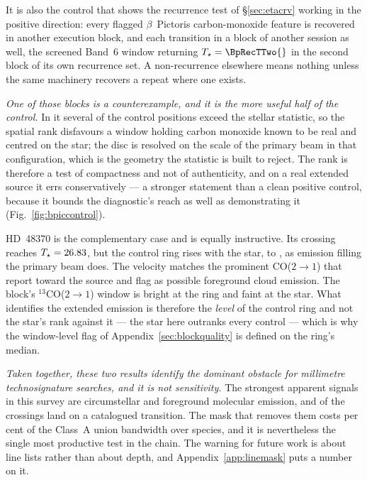 It is also the control that shows the recurrence test of
\S\ref{sec:etacrv} working in the positive direction: every flagged
$\beta$~Pictoris carbon-monoxide feature is recovered in another execution
block, and each transition in a block of another session as well, the
screened Band~6 window returning
$T_\star=\BpRecTTwo{}$ in the second block of its own recurrence set. A
non-recurrence elsewhere means nothing unless the same machinery recovers a
repeat where one exists.

\emph{One of those blocks is a counterexample, and it is the more useful half
of the control.} In it several of the \NCtrl{} control positions exceed the
stellar statistic, so the spatial rank disfavours a window holding carbon
monoxide known to be real and centred on the star; the disc is resolved on
the scale of the primary beam in that configuration, which is the geometry
the statistic is built to reject. The rank is therefore a test of
compactness and not of authenticity, and on a real extended source it errs
conservatively --- a stronger statement than a clean positive control, because
it bounds the diagnostic's reach as well as demonstrating it
(Fig.~\ref{fig:bpiccontrol}).



HD~48370 is the complementary case and is equally instructive. Its crossing
reaches $T_\star=26.83$, but the control ring rises with the star, to
\HdRingMax, as emission filling the primary beam does. The velocity matches
the prominent CO($2{\to}1$) that \citet{Cataldi2023} report toward the
source and flag as possible foreground cloud emission. The block's
$^{13}$CO($2{\to}1$) window is bright at the ring and faint at the star.
What identifies the extended emission is therefore the \emph{level} of the
control ring and not the star's rank against it --- the star here outranks
every control --- which is why the window-level flag of
Appendix~\ref{sec:blockquality} is defined on the ring's median.

\emph{Taken together, these two results identify the dominant obstacle for
millimetre technosignature searches, and it is not sensitivity.} The
strongest apparent signals in this survey are circumstellar and foreground
molecular emission, and \NAttributed{} of the \NCross{} crossings land on a
catalogued transition. The mask that removes them costs \MkMaskAPct{} per
cent of the Class~A union bandwidth over \FrNSpec{} species, and it is
nevertheless the single most productive test in the chain. The warning for
future work is about line lists rather than about depth, and
Appendix~\ref{app:linemask} puts a number on it.

